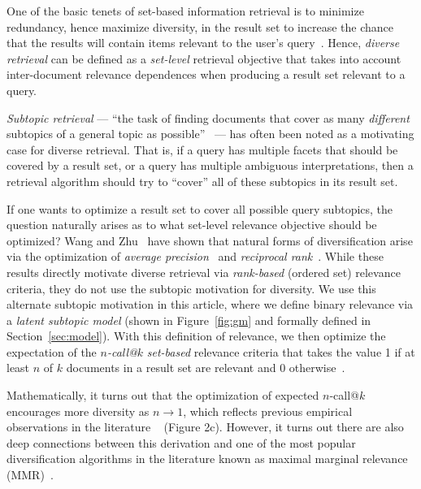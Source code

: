 One of the basic tenets of set-based information retrieval is to
minimize redundancy, hence maximize diversity, in the result set to
increase the chance that the results will contain items relevant to
the user's query~\cite{goffman64OnRelevanceAsAMeasure}.  Hence, \emph{diverse retrieval}
can be defined as a \emph{set-level} retrieval objective that takes
into account inter-document relevance dependences when producing a
result set relevant to a query.

\emph{Subtopic retrieval} --- ``the task of finding documents that
cover as many \emph{different} subtopics of a general topic as
possible''~\cite{zhai03Beyond} --- has often been noted as a
motivating case for diverse retrieval.  That is, if a query has
multiple facets that should be covered by a result set, or a query has
multiple ambiguous interpretations, then a retrieval algorithm should
try to ``cover'' all of these subtopics in its result set.  

If one wants to optimize a result set to cover all possible query
subtopics, the question naturally arises as to what set-level
relevance objective should be optimized?  Wang and
Zhu~\cite{wangzhu10} have shown that natural forms of diversification
arise via the optimization of \emph{average precision}~\cite{ap} and
\emph{reciprocal rank}~\cite{mrr}.  While these results directly
motivate diverse retrieval via \emph{rank-based} (ordered set)
relevance criteria, they do not use the subtopic motivation for
diversity.  We use this alternate subtopic motivation in this article,
where we define binary relevance via a \emph{latent subtopic model}
(shown in Figure~\ref{fig:gm} and 
formally defined in Section~\ref{sec:model}).  With this
definition of relevance, we then optimize the expectation of
the \emph{$n$-call@$k$} \emph{set-based} relevance criteria that takes
the value 1 if at least $n$ of $k$ documents in a result set are
relevant and 0 otherwise~\cite{chen06Less}.

Mathematically, it turns out that the optimization of expected
$n$-call@$k$ encourages more diversity as $n \to 1$, which reflects
previous empirical observations in the literature
~\cite{wang09PortfolioTheory} (Figure 2c).  However, it turns out
there are also deep connections between this derivation and one of the
most popular diversification algorithms in the literature known as
maximal marginal relevance (MMR)~\cite{carbonell98MMR}.

